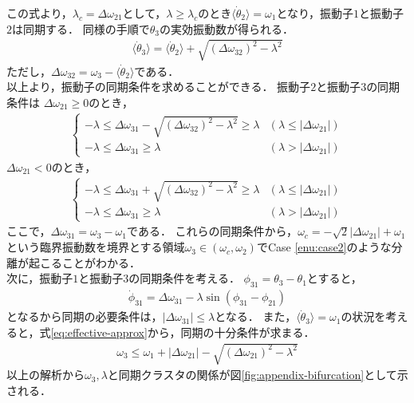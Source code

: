 \documentclass[../main]{subfiles}
\begin{document}
この式より，$\lambda_c=\Delta\omega_{21}$として，$\lambda\geq\lambda_c$のとき$\langle\dot{\theta}_2\rangle=\omega_1$となり，振動子$1$と振動子$2$は同期する．
同様の手順で$\theta_3$の実効振動数が得られる．
\begin{align}
    \label{eq:effective-approx}
    \langle\dot{\theta}_3\rangle=\langle\dot{\theta}_2\rangle+\sqrt{(\Delta\omega_{32})^2-\lambda^2}
\end{align}
ただし，$\Delta\omega_{32}=\omega_3-\langle\dot{\theta}_2\rangle$である．\\
以上より，振動子の同期条件を求めることができる．
振動子$2$と振動子$3$の同期条件は
$\Delta\omega_{21}\geq 0$のとき，
\begin{align*}
    \begin{cases}
        -\lambda\leq\Delta\omega_{31}-\sqrt{(\Delta\omega_{32})^2-\lambda^2}\geq\lambda & (\lambda\leq|\Delta\omega_{21}|)\\
        -\lambda\leq\Delta\omega_{31}\geq\lambda & (\lambda>|\Delta\omega_{21}|)
    \end{cases}
\end{align*}
$\Delta\omega_{21}< 0$のとき，
\begin{align*}
    \begin{cases}
        -\lambda\leq\Delta\omega_{31}+\sqrt{(\Delta\omega_{32})^2-\lambda^2}\geq\lambda & (\lambda\leq|\Delta\omega_{21}|)\\
        -\lambda\leq\Delta\omega_{31}\geq\lambda & (\lambda>|\Delta\omega_{21}|)
    \end{cases}
\end{align*}
ここで，$\Delta\omega_{31}=\omega_3-\omega_1$である．
これらの同期条件から，$\omega_c=-\sqrt{2}|\Delta\omega_{21}|+\omega_1$という臨界振動数を境界とする領域$\omega_3\in(\omega_c,\omega_2)$でCase \ref{enu:case2}のような分離が起こることがわかる．\\
次に，振動子$1$と振動子$3$の同期条件を考える．
$\phi_{31}=\theta_3-\theta_1$とすると，
\begin{align*}
    \dot{\phi}_{31}=\Delta\omega_{31}-\lambda\sin(\phi_{31}-\phi_{21})
\end{align*}
となるから同期の必要条件は，$|\Delta\omega_{31}|\leq \lambda$となる．
また，$\langle\dot{\theta}_3\rangle=\omega_1$の状況を考えると，式\eqref{eq:effective-approx}から，同期の十分条件が求まる．
\begin{align*}
    \omega_3\leq\omega_1+|\Delta\omega_{21}|-\sqrt{(\Delta\omega_{21})^2-\lambda^2}
\end{align*}
以上の解析から$\omega_3,\lambda$と同期クラスタの関係が図\ref{fig:appendix-bifurcation}として示される．
\end{document}
